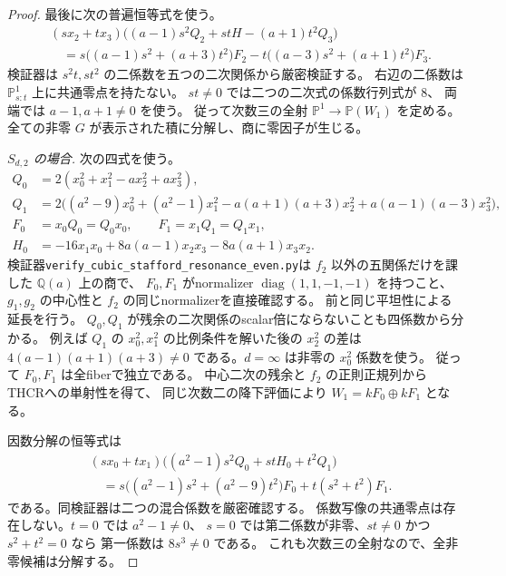 \begin{proof}
最後に次の普遍恒等式を使う。
\[
\begin{split}
 &(s x_2+t x_3)
 \bigl((a-1)s^2Q_2+stH-(a+1)t^2Q_3\bigr)\\
 &\quad=s\bigl((a-1)s^2+(a+3)t^2\bigr)F_2
       -t\bigl((a-3)s^2+(a+1)t^2\bigr)F_3.
\end{split}
\]
検証器は $s^2t,st^2$ の二係数を五つの二次関係から厳密検証する。
右辺の二係数は $\mathbb P^1_{s:t}$ 上に共通零点を持たない。
$st\ne0$ では二つの二次式の係数行列式が $8$、
両端では $a-1,a+1\ne0$ を使う。
従って次数三の全射 $\mathbb P^1\to\mathbb P(W_1)$ を定める。
全ての非零 $G$ が表示された積に分解し、商に零因子が生じる。

\emph{$S_{d,2}$ の場合.}
次の四式を使う。
\[
\begin{split}
 Q_0&=2(x_0^2+x_1^2-a x_2^2+a x_3^2),\\
 Q_1&=2\bigl((a^2-9)x_0^2+(a^2-1)x_1^2
       -a(a+1)(a+3)x_2^2+a(a-1)(a-3)x_3^2\bigr),\\
 F_0&=x_0Q_0=Q_0x_0,\qquad F_1=x_1Q_1=Q_1x_1,\\
 H_0&=-16x_1x_0+8a(a-1)x_2x_3-8a(a+1)x_3x_2.
\end{split}
\]
検証器\texttt{verify\_cubic\_stafford\_resonance\_even.py}は
$f_2$ 以外の五関係だけを課した $\mathbb Q(a)$ 上の商で、
$F_0,F_1$ がnormalizer $\operatorname{diag}(1,1,-1,-1)$ を持つこと、
$g_1,g_2$ の中心性と $f_2$ の同じnormalizerを直接確認する。
前と同じ平坦性による延長を行う。
$Q_0,Q_1$ が残余の二次関係のscalar倍にならないことも四係数から分かる。
例えば $Q_1$ の $x_0^2,x_1^2$ の比例条件を解いた後の $x_2^2$ の差は
$4(a-1)(a+1)(a+3)\ne0$ である。$d=\infty$ は非零の $x_0^2$ 係数を使う。
従って $F_0,F_1$ は全fiberで独立である。
中心二次の残余と $f_2$ の正則正規列からTHCRへの単射性を得て、
同じ次数二の降下評価により $W_1=kF_0\oplus kF_1$ となる。

因数分解の恒等式は
\[
\begin{split}
 &(s x_0+t x_1)\bigl((a^2-1)s^2Q_0+stH_0+t^2Q_1\bigr)\\
 &\quad=s\bigl((a^2-1)s^2+(a^2-9)t^2\bigr)F_0
       +t(s^2+t^2)F_1.
\end{split}
\]
である。同検証器は二つの混合係数を厳密確認する。
係数写像の共通零点は存在しない。$t=0$ では $a^2-1\ne0$、
$s=0$ では第二係数が非零、$st\ne0$ かつ $s^2+t^2=0$ なら
第一係数は $8s^3\ne0$ である。
これも次数三の全射なので、全非零候補は分解する。


\end{proof}
